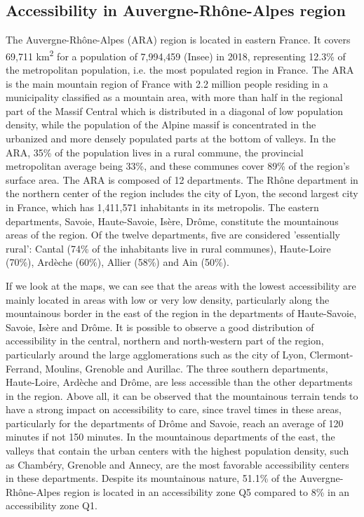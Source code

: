 \subsection*{Accessibility in Auvergne-Rhône-Alpes region}

The Auvergne-Rhône-Alpes (ARA) region is located in eastern France. It covers
69,711 km\textsuperscript{2} for a population of 7,994,459 (Insee) in 2018,
representing 12.3\% of the metropolitan population, i.e. the most populated
region in France. The ARA is the main mountain region of France with 2.2 million
people residing in a municipality classified as a mountain area, with more than
half in the regional part of the Massif Central which is distributed in a
diagonal of low population density, while the population of the Alpine massif is
concentrated in the urbanized and more densely populated parts at the bottom of
valleys. In the ARA, 35\% of the population lives in a rural commune, the
provincial metropolitan average being 33\%, and these communes cover 89\% of the
region's surface area. The ARA is composed of 12 departments. The Rhône
department in the northern center of the region includes the city of Lyon, the
second largest city in France, which has 1,411,571 inhabitants in its
metropolis. The eastern departments, Savoie, Haute-Savoie, Isère, Drôme,
constitute the mountainous areas of the region. Of the twelve departments, five
are considered 'essentially rural': Cantal (74\% of the inhabitants live in
rural communes), Haute-Loire (70\%), Ardèche (60\%), Allier (58\%) and Ain
(50\%).

If we look at the maps, we can see that the areas with the lowest accessibility
are mainly located in areas with low or very low density, particularly along the
mountainous border in the east of the region in the departments of Haute-Savoie,
Savoie, Isère and Drôme. It is possible to observe a good distribution of
accessibility in the central, northern and north-western part of the region,
particularly around the large agglomerations such as the city of Lyon,
Clermont-Ferrand, Moulins, Grenoble and Aurillac. The three southern
departments, Haute-Loire, Ardèche and Drôme, are less accessible than the other
departments in the region. Above all, it can be observed that the mountainous
terrain tends to have a strong impact on accessibility to care, since travel
times in these areas, particularly for the departments of Drôme and Savoie,
reach an average of 120 minutes if not 150 minutes. In the mountainous
departments of the east, the valleys that contain the urban centers with the
highest population density, such as Chambéry, Grenoble and Annecy, are the most
favorable accessibility centers in these departments. Despite its mountainous
nature, 51.1\% of the Auvergne-Rhône-Alpes region is located in an accessibility
zone Q5 compared to 8\% in an accessibility zone Q1.


